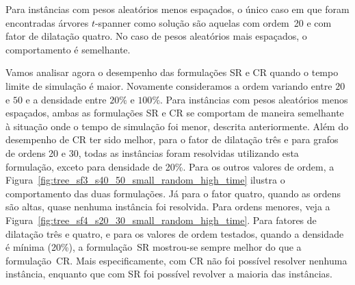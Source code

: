 Para instâncias com pesos aleatórios menos espaçados, o único caso em
que foram encontradas árvores $t$-spanner como solução são aquelas com
ordem~20 e com fator de dilatação quatro. No caso de pesos aleatórios mais
espaçados, o comportamento é semelhante.

Vamos analisar agora o desempenho das formulações SR e CR quando o
tempo limite de simulação é maior. Novamente consideramos a ordem
variando entre $20$ e $50$ e a densidade entre $20\%$ e $100\%$.  Para
instâncias com pesos aleatórios menos espaçados, ambas as formulações
SR e CR se comportam de maneira semelhante à situação onde o tempo de
simulação foi menor, descrita anteriormente. Além do desempenho de CR
ter sido melhor, para o fator de dilatação três e para grafos de ordens 20
e 30, todas as instâncias foram resolvidas utilizando esta formulação, exceto
para densidade de 20\%. Para os outros valores de ordem, a
Figura~\ref{fig:tree_sf3_s40_50_small_random_high_time} ilustra o
comportamento das duas formulações. Já para o fator quatro, quando as
ordens são altas, quase nenhuma instância foi resolvida. Para ordens
menores, veja a
Figura~\ref{fig:tree_sf4_s20_30_small_random_high_time}.  Para fatores
de dilatação três e quatro, e para os valores de ordem testados, quando a
densidade é mínima (20\%), a formulação~SR mostrou-se sempre melhor do
que a formulação~CR. Mais especificamente, com CR não foi possível
resolver nenhuma instância, enquanto que com SR foi possível revolver
a maioria das instâncias.

